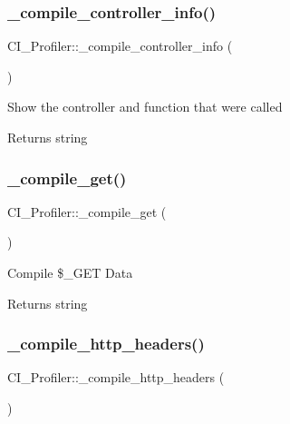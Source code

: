 \subsubsection{\texorpdfstring{\+\_\+compile\+\_\+controller\+\_\+info()}{\_compile\_controller\_info()}}
{\footnotesize\ttfamily C\+I\+\_\+\+Profiler\+::\+\_\+compile\+\_\+controller\+\_\+info (\begin{DoxyParamCaption}{ }\end{DoxyParamCaption})\hspace{0.3cm}{\ttfamily [protected]}}

Show the controller and function that were called

\begin{DoxyReturn}{Returns}
string 
\end{DoxyReturn}
\mbox{\label{class_c_i___profiler_a4f477c68d391a5b43bbf769d9d7844b3}} 
\subsubsection{\texorpdfstring{\+\_\+compile\+\_\+get()}{\_compile\_get()}}
{\footnotesize\ttfamily C\+I\+\_\+\+Profiler\+::\+\_\+compile\+\_\+get (\begin{DoxyParamCaption}{ }\end{DoxyParamCaption})\hspace{0.3cm}{\ttfamily [protected]}}

Compile \$\+\_\+\+G\+ET Data

\begin{DoxyReturn}{Returns}
string 
\end{DoxyReturn}
\mbox{\label{class_c_i___profiler_a60609a2ac7c2e4cd73aaf0970663b25f}} 
\subsubsection{\texorpdfstring{\+\_\+compile\+\_\+http\+\_\+headers()}{\_compile\_http\_headers()}}
{\footnotesize\ttfamily C\+I\+\_\+\+Profiler\+::\+\_\+compile\+\_\+http\+\_\+headers (\begin{DoxyParamCaption}{ }\end{DoxyParamCaption})\hspace{0.3cm}{\ttfamily [protected]}}


